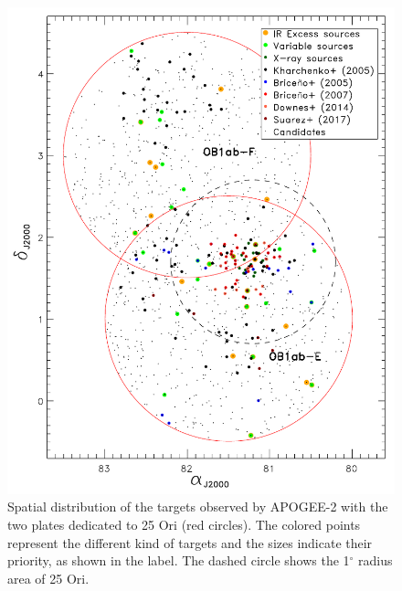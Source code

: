 \documentclass[12pt]{article}
\begin{document}
\begin{figure}%
	\centering
	\includegraphics[width=1.\textwidth]{sky_APOGEE-2.pdf}
	\caption[Spatial distribution of the targets observed by APOGEE-2 in 25 Ori]{Spatial distribution of the targets observed by APOGEE-2 with the two plates dedicated to 25 Ori (red circles). The colored points represent the different kind of targets and the sizes indicate their priority, as shown in the label. The dashed circle shows the 1$^\circ$ radius area of 25 Ori.}
	\label{fig_APOGEE-2:sky}
\end{figure}
\end{document}
